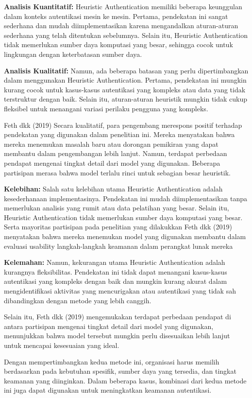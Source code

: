 \textbf{Analisis Kuantitatif:} Heuristic Authentication memiliki beberapa keunggulan dalam konteks autentikasi mesin ke mesin. Pertama, pendekatan ini sangat sederhana dan mudah diimplementasikan karena mengandalkan aturan-aturan sederhana yang telah ditentukan sebelumnya. Selain itu, Heuristic Authentication tidak memerlukan sumber daya komputasi yang besar, sehingga cocok untuk lingkungan dengan keterbatasan sumber daya.

\textbf{Analisis Kualitatif:} Namun, ada beberapa batasan yang perlu dipertimbangkan dalam menggunakan Heuristic Authentication. Pertama, pendekatan ini mungkin kurang cocok untuk kasus-kasus autentikasi yang kompleks atau data yang tidak terstruktur dengan baik. Selain itu, aturan-aturan heuristik mungkin tidak cukup fleksibel untuk menangani variasi perilaku pengguna yang kompleks.

Feth dkk (2019) Secara kualitatif, para pengembang merespons positif terhadap pendekatan yang digunakan dalam penelitian ini. Mereka menyatakan bahwa mereka menemukan masalah baru atau dorongan pemikiran yang dapat membantu dalam pengembangan lebih lanjut. Namun, terdapat perbedaan pendapat mengenai tingkat detail dari model yang digunakan. Beberapa partisipan merasa bahwa model terlalu rinci untuk sebagian besar heuristik.

\textbf{Kelebihan:} Salah satu kelebihan utama Heuristic Authentication adalah kesederhanaan implementasinya. Pendekatan ini mudah diimplementasikan tanpa memerlukan analisis yang rumit atau data pelatihan yang besar. Selain itu, Heuristic Authentication tidak memerlukan sumber daya komputasi yang besar. Serta mayoritas partisipan pada penelitian yang dilakukkan Feth dkk (2019) menyatakan bahwa mereka menemukan model yang digunakan membantu dalam evaluasi usability langkah-langkah keamanan dalam perangkat lunak mereka

\textbf{Kelemahan:} Namun, kekurangan utama Heuristic Authentication adalah kurangnya fleksibilitas. Pendekatan ini tidak dapat menangani kasus-kasus autentikasi yang kompleks dengan baik dan mungkin kurang akurat dalam mengidentifikasi aktivitas yang mencurigakan atau autentikasi yang tidak sah dibandingkan dengan metode yang lebih canggih.

Selain itu, Feth dkk (2019) mengemukakan terdapat perbedaan pendapat di antara partisipan mengenai tingkat detail dari model yang digunakan, menunjukkan bahwa model tersebut mungkin perlu disesuaikan lebih lanjut untuk mencapai kesesuaian yang ideal.

Dengan mempertimbangkan kedua metode ini, organisasi harus memilih berdasarkan pada kebutuhan spesifik, sumber daya yang tersedia, dan tingkat keamanan yang diinginkan. Dalam beberapa kasus, kombinasi dari kedua metode ini juga dapat digunakan untuk meningkatkan keamanan autentikasi.
